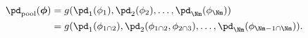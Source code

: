 \begin{align}
  \pd_{\text{pool}}(\boldsymbol{\phi}) &= g(\pd_{1}(\phi_{1}), \pd_{2}(\phi_{2}), \ldots, \pd_{\Nm}(\phi_{\Nm})) \\
  &= g(\pd_{1}(\phi_{1 \cap 2}), \pd_{2}(\phi_{1 \cap 2}, \phi_{2 \cap 3}), \ldots, \pd_{\Nm}(\phi_{\Nm - 1 \cap \Nm})).
  \label{eqn:pooled-prior-general-def}
\end{align}